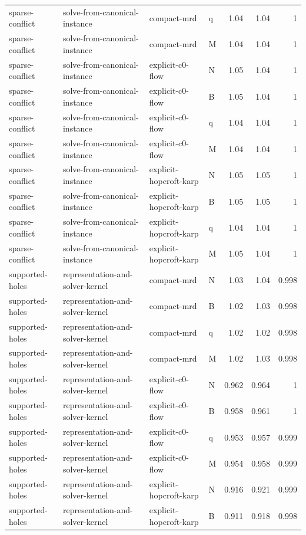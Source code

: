 \begin{table}[t]
\begin{tabular}{llllrrr}
sparse-conflict & solve-from-canonical-instance & compact-mrd & q & 1.04 & 1.04 & 1 \\
sparse-conflict & solve-from-canonical-instance & compact-mrd & M & 1.04 & 1.04 & 1 \\
sparse-conflict & solve-from-canonical-instance & explicit-c0-flow & N & 1.05 & 1.04 & 1 \\
sparse-conflict & solve-from-canonical-instance & explicit-c0-flow & B & 1.05 & 1.04 & 1 \\
sparse-conflict & solve-from-canonical-instance & explicit-c0-flow & q & 1.04 & 1.04 & 1 \\
sparse-conflict & solve-from-canonical-instance & explicit-c0-flow & M & 1.04 & 1.04 & 1 \\
sparse-conflict & solve-from-canonical-instance & explicit-hopcroft-karp & N & 1.05 & 1.05 & 1 \\
sparse-conflict & solve-from-canonical-instance & explicit-hopcroft-karp & B & 1.05 & 1.05 & 1 \\
sparse-conflict & solve-from-canonical-instance & explicit-hopcroft-karp & q & 1.04 & 1.04 & 1 \\
sparse-conflict & solve-from-canonical-instance & explicit-hopcroft-karp & M & 1.05 & 1.04 & 1 \\
supported-holes & representation-and-solver-kernel & compact-mrd & N & 1.03 & 1.04 & 0.998 \\
supported-holes & representation-and-solver-kernel & compact-mrd & B & 1.02 & 1.03 & 0.998 \\
supported-holes & representation-and-solver-kernel & compact-mrd & q & 1.02 & 1.02 & 0.998 \\
supported-holes & representation-and-solver-kernel & compact-mrd & M & 1.02 & 1.03 & 0.998 \\
supported-holes & representation-and-solver-kernel & explicit-c0-flow & N & 0.962 & 0.964 & 1 \\
supported-holes & representation-and-solver-kernel & explicit-c0-flow & B & 0.958 & 0.961 & 1 \\
supported-holes & representation-and-solver-kernel & explicit-c0-flow & q & 0.953 & 0.957 & 0.999 \\
supported-holes & representation-and-solver-kernel & explicit-c0-flow & M & 0.954 & 0.958 & 0.999 \\
supported-holes & representation-and-solver-kernel & explicit-hopcroft-karp & N & 0.916 & 0.921 & 0.999 \\
supported-holes & representation-and-solver-kernel & explicit-hopcroft-karp & B & 0.911 & 0.918 & 0.998 \\

\end{tabular}
\end{table}
